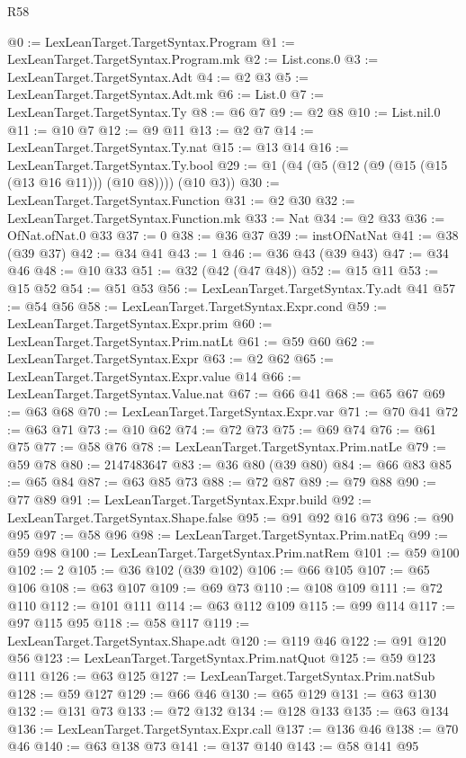 \begin{lexlean}{R58}
\begin{coremodule}
@0 := LexLeanTarget.TargetSyntax.Program
@1 := LexLeanTarget.TargetSyntax.Program.mk
@2 := List.cons.{0}
@3 := LexLeanTarget.TargetSyntax.Adt
@4 := @2 @3
@5 := LexLeanTarget.TargetSyntax.Adt.mk
@6 := List.{0}
@7 := LexLeanTarget.TargetSyntax.Ty
@8 := @6 @7
@9 := @2 @8
@10 := List.nil.{0}
@11 := @10 @7
@12 := @9 @11
@13 := @2 @7
@14 := LexLeanTarget.TargetSyntax.Ty.nat
@15 := @13 @14
@16 := LexLeanTarget.TargetSyntax.Ty.bool
@29 := @1 (@4 (@5 (@12 (@9 (@15 (@15 (@13 @16 @11))) (@10 @8)))) (@10 @3))
@30 := LexLeanTarget.TargetSyntax.Function
@31 := @2 @30
@32 := LexLeanTarget.TargetSyntax.Function.mk
@33 := Nat
@34 := @2 @33
@36 := OfNat.ofNat.{0} @33
@37 := 0
@38 := @36 @37
@39 := instOfNatNat
@41 := @38 (@39 @37)
@42 := @34 @41
@43 := 1
@46 := @36 @43 (@39 @43)
@47 := @34 @46
@48 := @10 @33
@51 := @32 (@42 (@47 @48))
@52 := @15 @11
@53 := @15 @52
@54 := @51 @53
@56 := LexLeanTarget.TargetSyntax.Ty.adt @41
@57 := @54 @56
@58 := LexLeanTarget.TargetSyntax.Expr.cond
@59 := LexLeanTarget.TargetSyntax.Expr.prim
@60 := LexLeanTarget.TargetSyntax.Prim.natLt
@61 := @59 @60
@62 := LexLeanTarget.TargetSyntax.Expr
@63 := @2 @62
@65 := LexLeanTarget.TargetSyntax.Expr.value @14
@66 := LexLeanTarget.TargetSyntax.Value.nat
@67 := @66 @41
@68 := @65 @67
@69 := @63 @68
@70 := LexLeanTarget.TargetSyntax.Expr.var
@71 := @70 @41
@72 := @63 @71
@73 := @10 @62
@74 := @72 @73
@75 := @69 @74
@76 := @61 @75
@77 := @58 @76
@78 := LexLeanTarget.TargetSyntax.Prim.natLe
@79 := @59 @78
@80 := 2147483647
@83 := @36 @80 (@39 @80)
@84 := @66 @83
@85 := @65 @84
@87 := @63 @85 @73
@88 := @72 @87
@89 := @79 @88
@90 := @77 @89
@91 := LexLeanTarget.TargetSyntax.Expr.build
@92 := LexLeanTarget.TargetSyntax.Shape.false
@95 := @91 @92 @16 @73
@96 := @90 @95
@97 := @58 @96
@98 := LexLeanTarget.TargetSyntax.Prim.natEq
@99 := @59 @98
@100 := LexLeanTarget.TargetSyntax.Prim.natRem
@101 := @59 @100
@102 := 2
@105 := @36 @102 (@39 @102)
@106 := @66 @105
@107 := @65 @106
@108 := @63 @107
@109 := @69 @73
@110 := @108 @109
@111 := @72 @110
@112 := @101 @111
@114 := @63 @112 @109
@115 := @99 @114
@117 := @97 @115 @95
@118 := @58 @117
@119 := LexLeanTarget.TargetSyntax.Shape.adt
@120 := @119 @46
@122 := @91 @120 @56
@123 := LexLeanTarget.TargetSyntax.Prim.natQuot
@125 := @59 @123 @111
@126 := @63 @125
@127 := LexLeanTarget.TargetSyntax.Prim.natSub
@128 := @59 @127
@129 := @66 @46
@130 := @65 @129
@131 := @63 @130
@132 := @131 @73
@133 := @72 @132
@134 := @128 @133
@135 := @63 @134
@136 := LexLeanTarget.TargetSyntax.Expr.call
@137 := @136 @46
@138 := @70 @46
@140 := @63 @138 @73
@141 := @137 @140
@143 := @58 @141 @95

\end{coremodule}
\end{lexlean}

